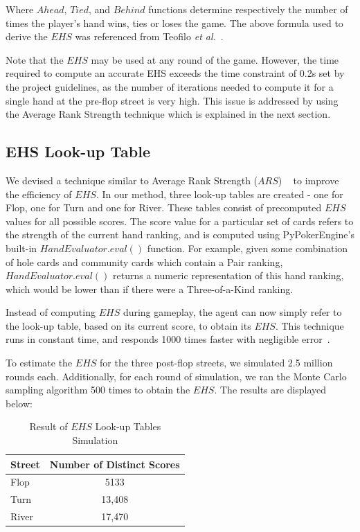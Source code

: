 \documentclass{article}
\begin{document}
\noindent Where $Ahead$, $Tied$, and $Behind$ functions determine respectively the number of times the player's hand wins, ties or loses the game. The above formula used to derive the $EHS$ was referenced from Teofilo \textit{et al.}~. 

Note that the $EHS$ may be used at any round of the game. However, the time required to compute an accurate EHS exceeds the time constraint of 0.2s set by the project guidelines, as the number of iterations needed to compute it for a single hand at the pre-flop street is very high. This issue is addressed by using the Average Rank Strength technique which is explained in the next section.

\subsection{EHS Look-up Table}

We devised a technique similar to Average Rank Strength ($ARS$) ~\cite{trc:ars} to improve the efficiency of $EHS$. In our method, three look-up tables are created - one for Flop, one for Turn and one for River. These tables consist of precomputed $EHS$ values for all possible scores. The score value for a particular set of cards refers to the strength of the current hand ranking, and is computed using PyPokerEngine's built-in $HandEvaluator.eval()$ function. For example, given some combination of hole cards and community cards which contain a Pair ranking, $HandEvaluator.eval()$ returns a numeric representation of this hand ranking, which would be lower than if there were a Three-of-a-Kind ranking. 

Instead of computing $EHS$ during gameplay, the agent can now simply refer to the look-up table, based on its current score, to obtain its $EHS$. This technique runs in constant time, and responds 1000 times faster with negligible error~\cite{trc:ars}.

To estimate the $EHS$ for the three post-flop streets, we simulated 2.5 million rounds each. Additionally, for each round of simulation, we ran the Monte Carlo sampling algorithm 500 times to obtain the $EHS$. The results are displayed below:

\begin{table}[h!]
  \begin{center}
    \begin{tabular}{l|c}
      \textbf{Street} & \textbf{Number of Distinct Scores} \\
      \hline
      Flop & 5133 \\
      Turn & 13,408 \\
      River & 17,470 \\
    \end{tabular}
    \caption{Result of $EHS$ Look-up Tables Simulation}
    \label{tab:table2}
  \end{center}
\end{table}
\end{document}
